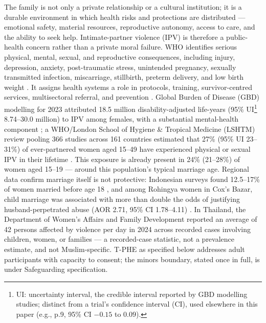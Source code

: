 \documentclass[11pt]{article}
\newcommand{\tphe}{T\mbox{-}PHE}
\begin{document}
The family is not only a private relationship or a cultural institution; it is a durable environment in which health risks and protections are distributed --- emotional safety, material resources, reproductive autonomy, access to care, and the ability to seek help. Intimate-partner violence (IPV) is therefore a public-health concern rather than a private moral failure. WHO identifies serious physical, mental, sexual, and reproductive consequences, including injury, depression, anxiety, post-traumatic stress, unintended pregnancy, sexually transmitted infection, miscarriage, stillbirth, preterm delivery, and low birth weight \cite{who_vaw_2026}. It assigns health systems a role in protocols, training, survivor-centred services, multisectoral referral, and prevention \cite{who_vaw_2026}. Global Burden of Disease (GBD) modelling for 2023 attributed 18.5 million disability-adjusted life-years (95\% UI\footnote{UI: uncertainty interval, the credible interval reported by GBD modelling studies; distinct from a trial's confidence interval (CI), used elsewhere in this paper (e.g., p.9, 95\% CI $-0.15$ to $0.09$).} 8.74--30.0 million) to IPV among females, with a substantial mental-health component \cite{ref1}; a WHO/London School of Hygiene \& Tropical Medicine (LSHTM) review pooling 366 studies across 161 countries estimated that 27\% (95\% UI 23--31\%) of ever-partnered women aged 15--49 have experienced physical or sexual IPV in their lifetime \cite{ref2}. This exposure is already present in 24\% (21--28\%) of women aged 15--19 \cite{ref2} --- around this population's typical marriage age. Regional data confirm marriage itself is not protective: Indonesian surveys found 12.5--17\% of women married before age 18 \cite{ref3,ref4}, and among Rohingya women in Cox's Bazar, child marriage was associated with more than double the odds of justifying husband-perpetrated abuse (AOR 2.71, 95\% CI 1.78--4.11) \cite{ref5}. In Thailand, the Department of Women's Affairs and Family Development reported an average of 42 persons affected by violence per day in 2024 across recorded cases involving children, women, or families \cite{dwf2024} --- a recorded-case statistic, not a prevalence estimate, and not Muslim-specific. \tphe{} as specified below addresses adult participants with capacity to consent; the minors boundary, stated once in full, is under Safeguarding specification.
\end{document}
